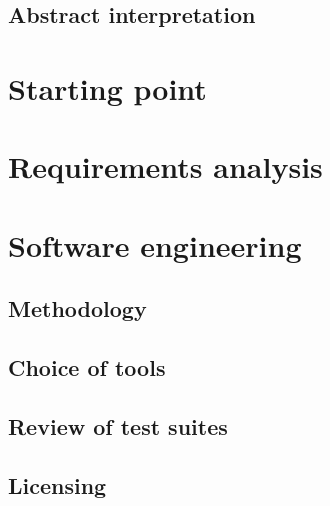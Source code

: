 \subsection{Abstract interpretation}

\section{Starting point}

\section{Requirements analysis}

\section{Software engineering}

\subsection{Methodology}

\subsection{Choice of tools}

\subsection{Review of test suites}

\subsection{Licensing}
